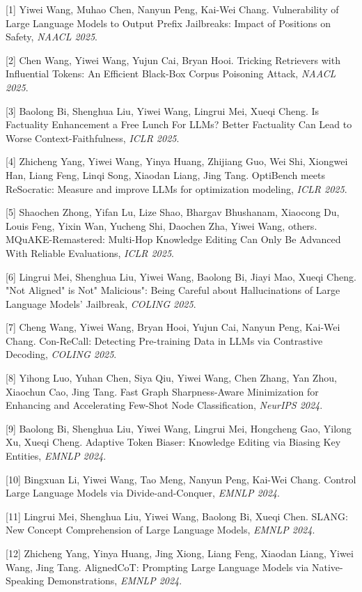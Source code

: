 [1] Yiwei Wang, Muhao Chen, Nanyun Peng, Kai-Wei Chang. Vulnerability of Large Language Models to Output Prefix Jailbreaks: Impact of Positions on Safety, \textit{NAACL 2025}.

[2] Chen Wang, Yiwei Wang, Yujun Cai, Bryan Hooi. Tricking Retrievers with Influential Tokens: An Efficient Black-Box Corpus Poisoning Attack, \textit{NAACL 2025}.

[3] Baolong Bi, Shenghua Liu, Yiwei Wang, Lingrui Mei, Xueqi Cheng. Is Factuality Enhancement a Free Lunch For LLMs? Better Factuality Can Lead to Worse Context-Faithfulness, \textit{ICLR 2025}.

[4] Zhicheng Yang, Yiwei Wang, Yinya Huang, Zhijiang Guo, Wei Shi, Xiongwei Han, Liang Feng, Linqi Song, Xiaodan Liang, Jing Tang. OptiBench meets ReSocratic: Measure and improve LLMs for optimization modeling, \textit{ICLR 2025}.

[5] Shaochen Zhong, Yifan Lu, Lize Shao, Bhargav Bhushanam, Xiaocong Du, Louis Feng, Yixin Wan, Yucheng Shi, Daochen Zha, Yiwei Wang, others. MQuAKE-Remastered: Multi-Hop Knowledge Editing Can Only Be Advanced With Reliable Evaluations, \textit{ICLR 2025}.

[6] Lingrui Mei, Shenghua Liu, Yiwei Wang, Baolong Bi, Jiayi Mao, Xueqi Cheng. "Not Aligned" is Not" Malicious": Being Careful about Hallucinations of Large Language Models' Jailbreak, \textit{COLING 2025}.

[7] Cheng Wang, Yiwei Wang, Bryan Hooi, Yujun Cai, Nanyun Peng, Kai-Wei Chang. Con-ReCall: Detecting Pre-training Data in LLMs via Contrastive Decoding, \textit{COLING 2025}.

[8] Yihong Luo, Yuhan Chen, Siya Qiu, Yiwei Wang, Chen Zhang, Yan Zhou, Xiaochun Cao, Jing Tang. Fast Graph Sharpness-Aware Minimization for Enhancing and Accelerating Few-Shot Node Classification, \textit{NeurIPS 2024}.

[9] Baolong Bi, Shenghua Liu, Yiwei Wang, Lingrui Mei, Hongcheng Gao, Yilong Xu, Xueqi Cheng. Adaptive Token Biaser: Knowledge Editing via Biasing Key Entities, \textit{EMNLP 2024}.

[10] Bingxuan Li, Yiwei Wang, Tao Meng, Nanyun Peng, Kai-Wei Chang. Control Large Language Models via Divide-and-Conquer, \textit{EMNLP 2024}.

[11] Lingrui Mei, Shenghua Liu, Yiwei Wang, Baolong Bi, Xueqi Chen. SLANG: New Concept Comprehension of Large Language Models, \textit{EMNLP 2024}.

[12] Zhicheng Yang, Yinya Huang, Jing Xiong, Liang Feng, Xiaodan Liang, Yiwei Wang, Jing Tang. AlignedCoT: Prompting Large Language Models via Native-Speaking Demonstrations, \textit{EMNLP 2024}.

